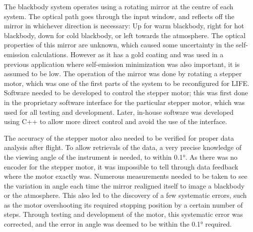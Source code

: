The blackbody system operates using a rotating mirror at the centre of each system. The optical path goes through the input window, and reflects off the mirror in whichever direction is necessary: Up for warm blackbody, right for hot blackbody, down for cold blackbody, or left towards the atmosphere. The optical properties of this mirror are unknown, which caused some uncertainty in the self-emission calculations. However as it has a gold coating and was used in a previous application where self-emission minimization was also important, it is assumed to be low. The operation of the mirror was done by rotating a stepper motor, which was one of the first parts of the system to be reconfigured for LIFE. Software needed to be developed to control the stepper motor; this was first done in the proprietary software interface for the particular stepper motor, which was used for all testing and development. Later, in-house software was developed using C++ to allow more direct control and avoid the use of the interface. 

The accuracy of the stepper motor also needed to be verified for proper data analysis after flight. To allow retrievals of the data, a very precise knowledge of the viewing angle of the instrument is needed, to within 0.1°. As there was no encoder for the stepper motor, it was impossible to tell through data feedback where the motor exactly was. Numerous measurements needed to be taken to see the variation in angle each time the mirror realigned itself to image a blackbody or the atmosphere. This also led to the discovery of a few systematic errors, such as the motor overshooting its required stopping position by a certain number of steps. Through testing and development of the motor, this systematic error was corrected, and the error in angle was deemed to be within the 0.1° required.

